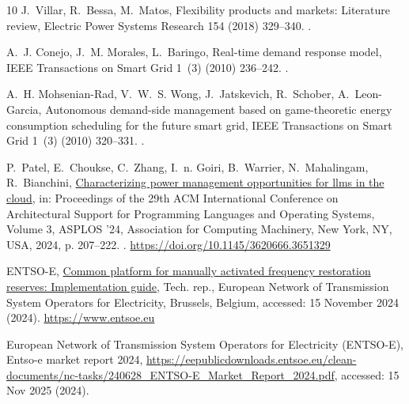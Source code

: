 \documentclass[preprint,12pt]{elsarticle}
\begin{document}
\begin{thebibliography}{10}
J.~Villar, R.~Bessa, M.~Matos, Flexibility products and markets: Literature
  review, Electric Power Systems Research 154 (2018) 329--340.
\newblock \href {https://doi.org/10.1016/j.epsr.2017.09.005}
  {}.

A.~J. Conejo, J.~M. Morales, L.~Baringo, Real-time demand response model, IEEE
  Transactions on Smart Grid 1~(3) (2010) 236--242.
\newblock \href {https://doi.org/10.1109/TSG.2010.2089056}
  {}.

A.~H. Mohsenian-Rad, V.~W.~S. Wong, J.~Jatskevich, R.~Schober, A.~Leon-Garcia,
  Autonomous demand-side management based on game-theoretic energy consumption
  scheduling for the future smart grid, IEEE Transactions on Smart Grid 1~(3)
  (2010) 320--331.
\newblock \href {https://doi.org/10.1109/TSG.2010.2089061}
  {}.

P.~Patel, E.~Choukse, C.~Zhang, I.~n. Goiri, B.~Warrier, N.~Mahalingam,
  R.~Bianchini, \href{https://doi.org/10.1145/3620666.3651329}{Characterizing
  power management opportunities for llms in the cloud}, in: Proceedings of the
  29th ACM International Conference on Architectural Support for Programming
  Languages and Operating Systems, Volume 3, ASPLOS '24, Association for
  Computing Machinery, New York, NY, USA, 2024, p. 207–222.
\newblock \href {https://doi.org/10.1145/3620666.3651329}
  {}.
\newline\urlprefix\url{https://doi.org/10.1145/3620666.3651329}

{ENTSO-E}, \href{https://www.entsoe.eu}{Common platform for manually activated
  frequency restoration reserves: Implementation guide}, Tech. rep., European
  Network of Transmission System Operators for Electricity, Brussels, Belgium,
  accessed: 15 November 2024 (2024).
\newline\urlprefix\url{https://www.entsoe.eu}

{European Network of Transmission System Operators for Electricity (ENTSO-E)},
  Entso-e market report 2024,
  \url{https://eepublicdownloads.entsoe.eu/clean-documents/nc-tasks/240628_ENTSO-E_Market_Report_2024.pdf},
  accessed: 15 Nov 2025 (2024).

\end{thebibliography}
\end{document}
